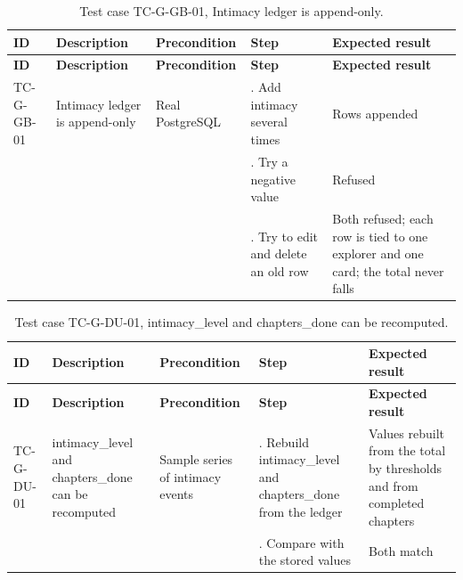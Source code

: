 {\small
\begin{longtable}{|>{\raggedright\arraybackslash}p{}|>{\raggedright\arraybackslash}p{}|>{\raggedright\arraybackslash}p{}|>{\raggedright\arraybackslash}p{}|>{\raggedright\arraybackslash}p{}|}
\caption{Test case TC-G-GB-01, Intimacy ledger is append-only.} \\
\hline
\textbf{ID} & \textbf{Description} & \textbf{Precondition} & \textbf{Step} & \textbf{Expected result} \\ \hline
\endfirsthead
\hline
\textbf{ID} & \textbf{Description} & \textbf{Precondition} & \textbf{Step} & \textbf{Expected result} \\ \hline
\endhead
TC-G-GB-01 & Intimacy ledger is append-only & Real PostgreSQL & 1. Add intimacy several times & Rows appended \\ \hline
 &  &  & 2. Try a negative value & Refused \\ \hline
 &  &  & 3. Try to edit and delete an old row & Both refused; each row is tied to one explorer and one card; the total never falls \\ \hline
\end{longtable}
}

{\small
\begin{longtable}{|>{\raggedright\arraybackslash}p{}|>{\raggedright\arraybackslash}p{}|>{\raggedright\arraybackslash}p{}|>{\raggedright\arraybackslash}p{}|>{\raggedright\arraybackslash}p{}|}
\caption{Test case TC-G-DU-01, intimacy\_level and chapters\_done can be recomputed.} \\
\hline
\textbf{ID} & \textbf{Description} & \textbf{Precondition} & \textbf{Step} & \textbf{Expected result} \\ \hline
\endfirsthead
\hline
\textbf{ID} & \textbf{Description} & \textbf{Precondition} & \textbf{Step} & \textbf{Expected result} \\ \hline
\endhead
TC-G-DU-01 & intimacy\_level and chapters\_done can be recomputed & Sample series of intimacy events & 1. Rebuild intimacy\_level and chapters\_done from the ledger & Values rebuilt from the total by thresholds and from completed chapters \\ \hline
 &  &  & 2. Compare with the stored values & Both match \\ \hline
\end{longtable}
}

